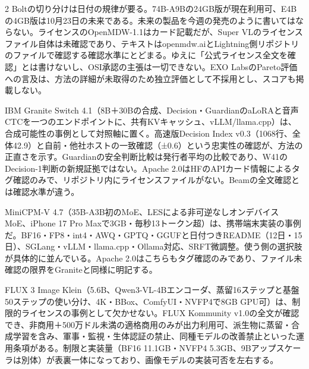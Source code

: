 \documentclass[lualatex,a4paper,10pt]{jlreq}
\begin{document}
\begin{multicols}{2}
Boltの切り分けは日付の規律が要る。74B-A9Bの24GB版が現在利用可、E4Bの4GB版は10月23日の未来である。未来の製品を今週の発売のように書いてはならない。ライセンスのOpenMDW-1.1はカード記載だが、Super VLのライセンスファイル自体は未確認であり、テキストはopenmdw.aiとLightning側リポジトリのファイルで確認する確認水準にとどまる。ゆえに「公式ライセンス全文を確認」とは書けないし、OSI承認の主張は一切できない。EXO LabsのPareto評価への言及は、方法の詳細が未取得のため独立評価として不採用とし、スコアも掲載しない。
\cite{B21,B72,B22,B20}


IBM Granite Switch 4.1（8B＋30Bの合成、Decision・GuardianのaLoRAと音声CTCを一つのエンドポイントに、共有KVキャッシュ、vLLM/llama.cpp）は、合成可能性の事例として対照軸に置く。高速版Decision Index v0.3（1068行、全体42.9）と自前・他社ホストの一致確認（±0.6）という忠実性の確認が、方法の正直さを示す。Guardianの安全判断比較は発行者平均の比較であり、W41のDecision-1判断の新規証拠ではない。Apache 2.0はHFのAPIカード情報によるタグ確認のみで、リポジトリ内にライセンスファイルがない。Beamの全文確認とは確認水準が違う。
\cite{B24,B73,B23,B25}


MiniCPM-V 4.7（35B-A3B初のMoE、LESによる非可逆なしオンデバイスMoE、iPhone 17 Pro Maxで3GB・毎秒13トークン超）は、携帯端末実装の事例だ。BF16・FP8・int4・AWQ・GPTQ・GGUFと日付つきREADME（12日・15日）、SGLang・vLLM・llama.cpp・Ollama対応、SRFT微調整。使う側の選択肢が具体的に並んでいる。Apache 2.0はこちらもタグ確認のみであり、ファイル未確認の限界をGraniteと同様に明記する。
\cite{B27,B74,B26}


FLUX 3 Image Klein（5.6B、Qwen3-VL-4Bエンコーダ、蒸留16ステップと基盤50ステップの使い分け、4K・BBox、ComfyUI・NVFP4で8GB GPU可）は、制限的ライセンスの事例として欠かせない。FLUX Kommunity v1.0の全文が確認でき、非商用＋500万ドル未満の適格商用のみが出力利用可、派生物に蒸留・合成学習を含み、軍事・監視・生体認証の禁止、同種モデルの改善禁止といった運用条項がある。制限と実装量（BF16 11.1GB・NVFP4 5.3GB、9Bアップスケーラは別体）が表裏一体になっており、画像モデルの実装可否を左右する。
\cite{B29,B28,B30}


\end{multicols} %
\end{document}
